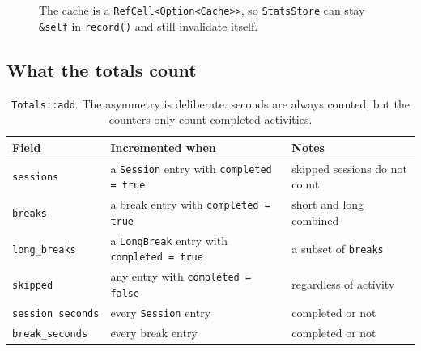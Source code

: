 \begin{figure}[H]
\centering
{}
\caption{The cache is a \texttt{RefCell<Option<Cache>>}, so \texttt{StatsStore} can stay
\texttt{\&self} in \texttt{record()} and still invalidate itself.}
\label{fig:cache}
\end{figure}

\subsection{What the totals count}

\begin{table}[H]
\centering\small
\begin{tabular}{@{}p{34mm} p{52mm} p{52mm}@{}}
\toprule
\textbf{Field} & \textbf{Incremented when} & \textbf{Notes} \\
\midrule
\texttt{sessions} & a \texttt{Session} entry with \texttt{completed = true} & skipped sessions do not count \\
\texttt{breaks} & a break entry with \texttt{completed = true} & short and long combined \\
\texttt{long\_breaks} & a \texttt{LongBreak} entry with \texttt{completed = true} & a subset of \texttt{breaks} \\
\texttt{skipped} & any entry with \texttt{completed = false} & regardless of activity \\
\texttt{session\_seconds} & every \texttt{Session} entry & completed or not \\
\texttt{break\_seconds} & every break entry & completed or not \\
\bottomrule
\end{tabular}
\caption{\texttt{Totals::add}. The asymmetry is deliberate: seconds are always counted,
but the counters only count completed activities.}
\end{table}

